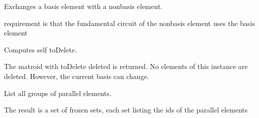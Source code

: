 \documentclass[letterpaper,12pt,english]{sphinxmanual}
\begin{document}
\begin{fulllineitems}
\begin{fulllineitems}
\end{fulllineitems}


\begin{fulllineitems}
\label{\detokenize{api/modules:cbmpy.fluxmodules.matroid.Matroid.exchange}}
\pysigstartsignatures
\pysiglinewithargsret
{}
{\sphinxparamcomma {}}
{}
\pysigstopsignatures
\sphinxAtStartPar
Exchanges a basis element with a non\sphinxhyphen{}basis element.

\sphinxAtStartPar
requirement is that the fundamental circuit of the non\sphinxhyphen{}basis element uses the
basis element

\end{fulllineitems}


\begin{fulllineitems}
\label{\detokenize{api/modules:cbmpy.fluxmodules.matroid.Matroid.delete}}
\pysigstartsignatures
\pysiglinewithargsret
{}
{}
{}
\pysigstopsignatures
\sphinxAtStartPar
Computes self toDelete.

\sphinxAtStartPar
The matroid with toDelete deleted is returned. No elements of this instance are
deleted. However, the current basis can change.

\end{fulllineitems}


\begin{fulllineitems}
\label{\detokenize{api/modules:cbmpy.fluxmodules.matroid.Matroid.parallel}}
\pysigstartsignatures
\pysiglinewithargsret
{}
{}
{}
\pysigstopsignatures
\sphinxAtStartPar
List all groups of parallel elements.

\sphinxAtStartPar
The result is a set of frozen sets, each set listing the ids of the parallel
elements

\end{fulllineitems}


\end{fulllineitems}
\end{document}
